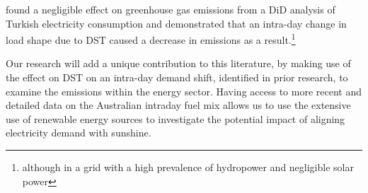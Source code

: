 \textcite{turkey} found a negligible effect on greenhouse gas emissions from a \ac{DiD} analysis of Turkish electricity consumption and demonstrated that an intra-day change in load shape due to \ac{DST} caused a decrease in emissions as a result.\footnote{although in a grid with a high prevalence of hydropower and negligible solar power}

Our research will add a unique contribution to this literature, by making use of the effect on \ac{DST} on an intra-day demand shift, identified in prior research, to examine the emissions within the energy sector. Having access to more recent and detailed data on the Australian intraday fuel mix allows us to use the extensive use of renewable energy sources to investigate the potential impact of aligning electricity demand with sunshine.















